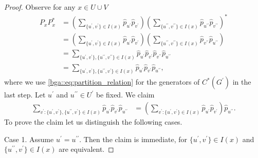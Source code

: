 \documentclass[a4paper]{amsart}
\begin{document}
\begin{proof}
    Observe for any $x \in U \cup V$
    \begin{align*}
        P_x P_x^\ast 
            &= \left( \sum_{\{u^\prime, v^\prime\} \in I(x)} \hat{p}_{u^\prime} \hat{p}_{v^\prime} \right)
            \left( \sum_{\{u^{\prime\prime}, v^{\prime\prime}\} \in I(x)} \hat{p}_{u^{\prime\prime}} \hat{p}_{v^{\prime\prime}} \right)^\ast \\
            &= \left( \sum_{\{u^\prime, v^\prime\} \in I(x)} \hat{p}_{u^\prime} \hat{p}_{v^\prime} \right)
            \left( \sum_{\{u^{\prime\prime}, v^{\prime\prime}\} \in I(x)} \hat{p}_{v^{\prime\prime}} \hat{p}_{u^{\prime\prime}} \right) \\
            &=  \sum_{\{u^\prime, v^\prime\}, \{u^{\prime\prime}, v^{\prime\prime}\} \in I(x)} \hat{p}_{u^\prime} \hat{p}_{v^\prime} \hat{p}_{v^{\prime\prime}} \hat{p}_{u^{\prime\prime}} \\
            &=  \sum_{\{u^\prime, v^\prime\}, \{u^{\prime\prime}, v^{\prime}\} \in I(x)} \hat{p}_{u^\prime} \hat{p}_{v^\prime} \hat{p}_{u^{\prime\prime}},
    \end{align*}
    where we use \eqref{bga::eq:partition_relation} for the generators of $C^\ast(G^\prime)$ in the last step.
    Let $u^\prime$ and $u^{\prime\prime} \in U^\prime$ be fixed. We claim
    \begin{align*}
        \sum_{v^\prime: \{u^\prime, v^\prime\}, \{u^{\prime\prime}, v^{\prime}\} \in I(x)} \hat{p}_{u^\prime} \hat{p}_{v^\prime} \hat{p}_{u^{\prime\prime}}
        &= \left( \sum_{v^\prime: \{u^\prime, v^\prime\} \in I(x)} \hat{p}_{u^\prime} \hat{p}_{v^\prime} \right) \hat{p}_{u^{\prime\prime}}.
    \end{align*}
    To prove the claim let us distinguish the following cases.

    Case 1. Assume $u^\prime = u^{\prime\prime}$. Then the claim is immediate, for $\{u^\prime, v^\prime\} \in I(x)$ and $\{u^{\prime\prime}, v^{\prime}\} \in I(x)$ are equivalent.


\end{proof}
\end{document}
